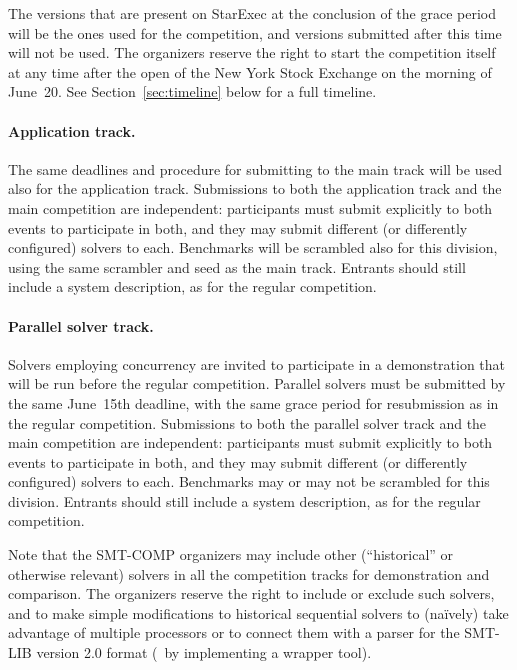 \documentclass[12pt]{article}
\begin{document}
The versions that are present on StarExec at the conclusion of the
grace period will be the ones used for the competition, and versions
submitted after this time will not be used.  The organizers reserve
the right to start the competition itself at any time after the open
of the New York Stock Exchange on the morning of June~20.  See
Section~\ref{sec:timeline} below for a full timeline.

\paragraph{Application track.} %
The same deadlines and procedure for submitting to the main track will be used
also for the application track. Submissions to both the application track and
the main competition are independent: participants must submit explicitly to
both events to participate in both, and they may submit different (or
differently configured) solvers to each.  Benchmarks will be scrambled also
for this division, using the same scrambler and seed as the main track.
Entrants should still include a system description, as for the regular
competition.

\paragraph{Parallel solver track.} %
Solvers employing concurrency are invited to participate in a
demonstration that will be run before the regular competition.
Parallel solvers must be submitted by the same June~15th deadline,
with the same grace period for resubmission as in the regular
competition.  Submissions to both the parallel solver track
and the main competition are independent: participants must submit
explicitly to both events to participate in both, and they may submit
different (or differently configured) solvers to each.  Benchmarks may
or may not be scrambled for this division.  Entrants should still
include a system description, as for the regular competition.

\medskip
\noindent
Note that the SMT-COMP organizers may include
other (``historical'' or otherwise relevant) solvers in all the competition tracks for
demonstration and comparison.  The organizers reserve the right to
include or exclude such solvers, and to make simple modifications
to historical sequential solvers to (na\"ively) take advantage of
multiple processors 
or to connect them with a parser for the SMT-LIB version 2.0 format
(\eg\ by implementing a wrapper tool).
\end{document}
